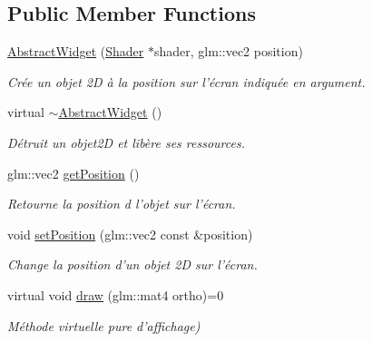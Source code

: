 \subsection*{Public Member Functions}
\begin{DoxyCompactItemize}
\item 
\hypertarget{classAbstractWidget_a385f0b11064be82084e3141602a2962e}{\hyperlink{classAbstractWidget_a385f0b11064be82084e3141602a2962e}{Abstract\-Widget} (\hyperlink{classShader}{Shader} $\ast$shader, glm\-::vec2 position)}\label{classAbstractWidget_a385f0b11064be82084e3141602a2962e}

\begin{DoxyCompactList}\small\item\em Crée un objet 2\-D à la position sur l'écran indiquée en argument. \end{DoxyCompactList}\item 
\hypertarget{classAbstractWidget_ace1ce0f76aeb82b810a0ac50059a0e59}{virtual \hyperlink{classAbstractWidget_ace1ce0f76aeb82b810a0ac50059a0e59}{$\sim$\-Abstract\-Widget} ()}\label{classAbstractWidget_ace1ce0f76aeb82b810a0ac50059a0e59}

\begin{DoxyCompactList}\small\item\em Détruit un objet2\-D et libère ses ressources. \end{DoxyCompactList}\item 
\hypertarget{classAbstractWidget_a1ad11e1303e1f73f77726a24167f943f}{glm\-::vec2 \hyperlink{classAbstractWidget_a1ad11e1303e1f73f77726a24167f943f}{get\-Position} ()}\label{classAbstractWidget_a1ad11e1303e1f73f77726a24167f943f}

\begin{DoxyCompactList}\small\item\em Retourne la position d l'objet sur l'écran. \end{DoxyCompactList}\item 
\hypertarget{classAbstractWidget_acc96658ec6504098e7e9cadcc78c3197}{void \hyperlink{classAbstractWidget_acc96658ec6504098e7e9cadcc78c3197}{set\-Position} (glm\-::vec2 const \&position)}\label{classAbstractWidget_acc96658ec6504098e7e9cadcc78c3197}

\begin{DoxyCompactList}\small\item\em Change la position d'un objet 2\-D sur l'écran. \end{DoxyCompactList}\item 
\hypertarget{classAbstractWidget_aa4fcf0bffd64956bda11ee5302641def}{virtual void \hyperlink{classAbstractWidget_aa4fcf0bffd64956bda11ee5302641def}{draw} (glm\-::mat4 ortho)=0}\label{classAbstractWidget_aa4fcf0bffd64956bda11ee5302641def}

\begin{DoxyCompactList}\small\item\em Méthode virtuelle pure d'affichage) \end{DoxyCompactList}\end{DoxyCompactItemize}

